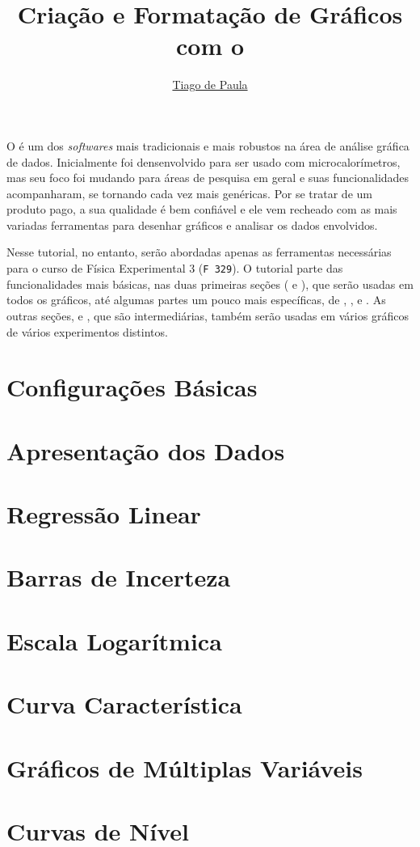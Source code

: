 \documentclass{article}
\title{Criação e Formatação de Gráficos com o}\softwarelogo
\author{\href{mailto:t187679@dac.unicamp.br}{Tiago de Paula}}
\date{}
\begin{document}
    \maketitle

    O \software é um dos \textit{softwares} mais tradicionais e mais robustos na área de análise gráfica de dados. Inicialmente foi densenvolvido para ser usado com microcalorímetros, mas seu foco foi mudando para áreas de pesquisa em geral e suas funcionalidades acompanharam, se tornando cada vez mais genéricas. Por se tratar de um produto pago, a sua qualidade é bem confiável e ele vem recheado com as mais variadas ferramentas para desenhar gráficos e analisar os dados envolvidos.

    Nesse tutorial, no entanto, serão abordadas apenas as ferramentas necessárias para o curso de Física Experimental 3 (\texttt{F 329}). O tutorial parte das funcionalidades mais básicas, nas duas primeiras seções ( e ), que serão usadas em todos os gráficos, até algumas partes um pouco mais específicas, de , ,  e . As outras seções,  e , que são intermediárias, também serão usadas em vários gráficos de vários experimentos distintos.

    \section{Configurações Básicas} \label{sec:basico}
        

    \section{Apresentação dos Dados} \label{sec:reta}
        

    \section{Regressão Linear} \label{sec:regres}
        

    \section{Barras de Incerteza} \label{sec:incert}
        

    \section{Escala Logarítmica} \label{sec:escala}
        

    \section{Curva Característica} \label{sec:caract}
        

    \section{Gráficos de Múltiplas Variáveis} \label{sec:multiv}
        

    \section{Curvas de Nível} \label{sec:contorno}
        
\end{document}
